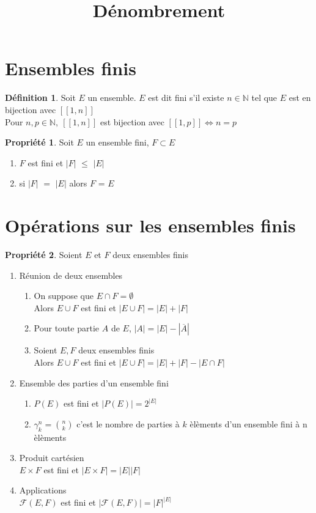 \documentclass[fleqn]{article}
\title{D\'enombrement}
\date{}
\theoremstyle{definition} \newtheorem*{defi}{D\'efinition}
\theoremstyle{definition} \newtheorem*{theo}{Th\'eor\`eme}
\theoremstyle{definition} \newtheorem*{coro}{Corollaire}
\theoremstyle{remark} \newtheorem*{rqs}{Remarques}
\theoremstyle{definition} \newtheorem*{prop}{Propri\'et\'e}
\begin{document}
\maketitle

\section{Ensembles finis}
\begin{defi}
	Soit $E$ un ensemble. $E$ est dit fini s'il existe $n \in \mathbb{N}$ tel que $E$ est en bijection avec $[\![1,n]\!]$ \\
	Pour $n, p \in \mathbb{N},\ [\![1,n]\!]$ est bijection avec $[\![1,p]\!] \Leftrightarrow n = p$
\end{defi}

\begin{prop} Soit $E$ un ensemble fini, $F \subset E$
	\begin{enumerate}
		\item $F$ est fini et $|F|$ $\leq$ $|E|$
		\item si $|F|$ $=$ $|E|$ alors $F$ = $E$
	\end{enumerate}
\end{prop}

\section{Op\'erations sur les ensembles finis}
\begin{prop} Soient $E$ et $F$ deux ensembles finis
	\begin{enumerate}
		\item R\'eunion de deux ensembles
			\begin{enumerate}
				\item On suppose que $E \cap F = \emptyset$ \\
					Alors $E \cup F$ est fini et $|E \cup F| = |E| + |F|$
				\item Pour toute partie $A$ de $E$, $|A| = |E| - |\overline{A}|$
				\item Soient $E, F$ deux ensembles finis \\
					Alors $E\cup F$ est fini et $|E \cup F| = |E| + |F| - |E \cap F|$
			\end{enumerate}
		\item Ensemble des parties d'un ensemble fini
			\begin{enumerate}
			\item $P(E)$ est fini et $|P(E)| = 2^{|E|}$
			\item $\gamma_k^n = \binom{n}{k}$ c'est le nombre de parties \`a $k$ \`el\`ements d'un ensemble fini \`a n \`el\`ements
			\end{enumerate}
		\item Produit cart\'esien \\
			$E\times F$ est fini et $|E\times F| = |E||F|$
		\item Applications \\
			$\mathcal{F}(E,F)$ est fini et $|\mathcal{F}(E,F)| = |F|^{|E|}$
	\end{enumerate}
\end{prop}
\end{document}

